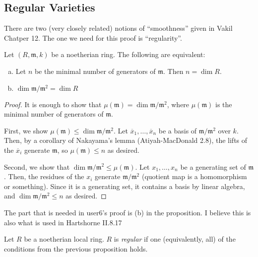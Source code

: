 

\subsection{Regular Varieties}

There are two (very closely related)
notions of ``smoothness'' given in Vakil Chatper 12.
The one we need for this proof is ``regularity''.

\begin{proposition} \label{prop:regular_def_equiv}
	Let \((R,\mathfrak{m},k)\) be a noetherian ring. 
	The following are equivalent:
	\begin{enumerate}[(a)]
		\item Let \(n\) be the minimal number of generators of
			\(\mathfrak{m}\).
			Then \(n = \dim R\).
		\item \(\dim \mathfrak{m} / \mathfrak{m}^{2}  = \dim R\)
	\end{enumerate}
\end{proposition}

\begin{proof}
	It is enough to show that 
	\(\mu(\mathfrak{m}) = \dim \mathfrak{m} / \mathfrak{m}^{2}\),
	where \(\mu(\mathfrak{m})\) is the minimal number of generators
	of \(\mathfrak{m}\).
	
	First, we show \(\mu(\mathfrak{m}) \leq \dim \mathfrak{m} / \mathfrak{m}^{2}\).
	Let \(\overline{x}_{1}, \ldots, \overline{x}_{n}\) 
	be a basis of \(\mathfrak{m} / \mathfrak{m}^{2}\) 
	over \(k\).
	Then, by a corollary of Nakayama's lemma (Atiyah-MacDonald 2.8),
	the lifts of the \(\overline{x}_{i}\) generate \(\mathfrak{m}\),
	so \(\mu(\mathfrak{m}) \leq n\) as desired.

	Second, we show that 
	\(\dim \mathfrak{m} / \mathfrak{m}^{2} \leq \mu(\mathfrak{m})\).
	Let \(x_{1}, \ldots, x_{n}\) be a generating set of 
	\(\mathfrak{m}\).
	Then, the residues of the \(x_{i}\) generate 
	\(\mathfrak{m} / \mathfrak{m}^{2}\) (quotient map is a 
	homomorphism or something).
	Since it is a generating set, it contains a basis by
	linear algebra, and
	\(\dim \mathfrak{m} / \mathfrak{m}^{2} \leq n\) as desired.
\end{proof}

The part that is needed in user6's proof is (b) in the proposition.
I believe this is also what is used in Hartshorne II.8.17

\begin{definition} \label{def:regular}
	Let \(R\) be a noetherian local ring.
	\(R\) is \textit{regular} if one (equivalently, all)
	of the conditions from the previous proposition holds.
\end{definition}

